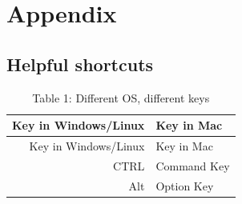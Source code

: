\documentclass[
  12pt,
  oneside]{book}
\begin{document}
\hypertarget{appendix}{%
\chapter{Appendix}\label{appendix}}

\hypertarget{helpful-shortcuts}{%
\section{Helpful shortcuts}\label{helpful-shortcuts}}

\begin{longtable}[]{@{}rl@{}}
\caption{Table 1: Different OS, different keys}\tabularnewline
\toprule\noalign{}
Key in Windows/Linux & Key in Mac \\
\midrule\noalign{}
\endfirsthead
\toprule\noalign{}
Key in Windows/Linux & Key in Mac \\
\midrule\noalign{}
\endhead
\bottomrule\noalign{}
\endlastfoot
CTRL & Command Key \\
Alt & Option Key \\
\end{longtable}
\end{document}
